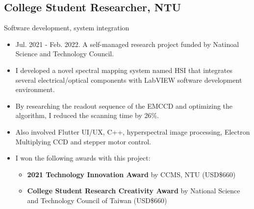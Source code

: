 \documentclass[12pt]{article}
\begin{document}
        \subsection*{College Student Researcher, NTU}
        {\sffamily
        Software development, system integration
        \begin{itemize}
            \item Jul. 2021 - Feb. 2022. A self-managed research project funded by Natinoal Science and Technology Council.
            \item I developed a novel spectral mapping system named HSI that integrates several electrical/optical components with LabVIEW software development environment. %
            \item By researching the readout sequence of the EMCCD and optimizing the algorithm, I reduced the scanning time by 26\%.
            \item Also involved Flutter UI/UX, C++, hyperspectral image processing, Electron Multiplying CCD and stepper motor control.
            \item I won the following awards with this project: 
            \begin{itemize}
                \item \textbf{2021 Technology Innovation Award} by CCMS, NTU (USD\$660)
                \item \textbf{College Student Research Creativity Award} by National Science and Technology Council of Taiwan (USD\$660)
            \end{itemize}
        \end{itemize}}
\end{document}
